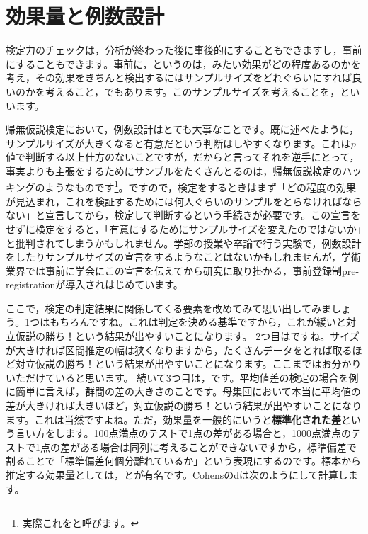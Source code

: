 \documentclass{ltjsarticle}
\begin{document}
\section{効果量と例数設計}
検定力のチェックは，分析が終わった後に事後的にすることもできますし，事前にすることもできます。事前に，というのは，みたい効果がどの程度あるのかを考え，その効果をきちんと検出するにはサンプルサイズをどれぐらいにすれば良いのかを考えること，でもあります。このサンプルサイズを考えることを，といいます。

帰無仮説検定において，例数設計はとても大事なことです。既に述べたように，サンプルサイズが大きくなると有意だという判断はしやすくなります。これは$p$値で判断する以上仕方のないことですが，だからと言ってそれを逆手にとって，事実よりも主張をするためにサンプルをたくさんとるのは，帰無仮説検定のハッキングのようなものです\footnote{実際これをと呼びます。}。ですので，検定をするときはまず「どの程度の効果が見込まれ，これを検証するためには何人ぐらいのサンプルをとらなければならない」と宣言してから，検定して判断するという手続きが必要です。この宣言をせずに検定をすると，「有意にするためにサンプルサイズを変えたのではないか」と批判されてしまうかもしれません。学部の授業や卒論で行う実験で，例数設計をしたりサンプルサイズの宣言をするようなことはないかもしれませんが，学術業界では事前に学会にこの宣言を伝えてから研究に取り掛かる，事前登録制pre-registrationが導入されはじめています。

ここで，検定の判定結果に関係してくる要素を改めてみて思い出してみましょう。1つはもちろんですね。これは判定を決める基準ですから，これが緩いと対立仮説の勝ち！という結果が出やすいことになります。
2つ目はですね。サイズが大きければ区間推定の幅は狭くなりますから，たくさんデータをとれば取るほど対立仮説の勝ち！という結果が出やすいことになります。ここまではお分かりいただけていると思います。
続いて3つ目は，です。平均値差の検定の場合を例に簡単に言えば，群間の差の大きさのことです。母集団において本当に平均値の差が大きければ大きいほど，対立仮説の勝ち！という結果が出やすいことになります。これは当然ですよね。ただ，効果量を一般的にいうと\textbf{標準化された差}という言い方をします。100点満点のテストで1点の差がある場合と，1000点満点のテストで1点の差がある場合は同列に考えることができないですから，標準偏差で割ることで「標準偏差何個分離れているか」という表現にするのです。標本から推定する効果量としては，とが有名です。Cohensのdは次のようにして計算します。
\end{document}
